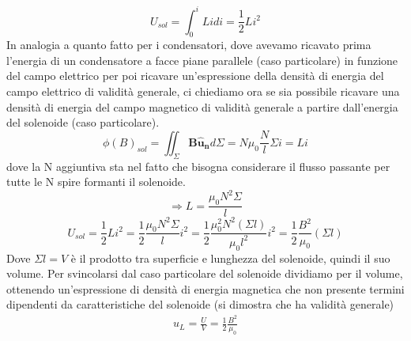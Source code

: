 \documentclass[
10pt, %
a4paper, %
oneside, %
headinclude,footinclude, %
BCOR5mm, %
]{scrartcl}
\begin{document}
\[U_{sol} = \int_{0}^{i}Lidi=\frac{1}{2}Li^2\]
In analogia a quanto fatto per i condensatori, dove avevamo ricavato prima l'energia di un condensatore a facce piane parallele (caso particolare) in funzione del campo elettrico per poi ricavare un'espressione della densità di energia del campo elettrico di validità generale, ci chiediamo ora se sia possibile ricavare una densità di energia del campo magnetico di validità generale a partire dall'energia del solenoide (caso particolare). 
\[\phi(B)_{sol} = \iint_{\Sigma}\mathbf{B}\mathbf{\hat{u}_n}d\Sigma = N \mu_0 \frac{N}{l}\Sigma i = Li\]
dove la N aggiuntiva sta nel fatto che bisogna considerare il flusso passante per tutte le N spire formanti il solenoide.\\
\[\Rightarrow L = \frac{\mu_0 N^2\Sigma}{l}\]
\[U_{sol} = \frac{1}{2}Li^2 = \frac{1}{2}\frac{\mu_0 N^2\Sigma}{l}i^2=\frac{1}{2}\frac{\mu_0^2 N^2(\Sigma l)}{\mu_0 l^2}i^2=\frac{1}{2}\frac{B^2}{\mu_0}(\Sigma l)\]
Dove \(\Sigma l= V \) è il prodotto tra superficie e lunghezza del solenoide, quindi il suo volume. Per svincolarsi dal caso particolare del solenoide dividiamo per il volume, ottenendo un'espressione di densità di energia magnetica che non presente termini dipendenti da caratteristiche del solenoide (si dimostra che ha validità generale)
\begin{align}\label{eq:densità_energia_magnetica}
u_L = \frac{U}{V} =\frac{1}{2}\frac{B^2}{\mu_0} 
\end{align}
\newpage
\end{document}
